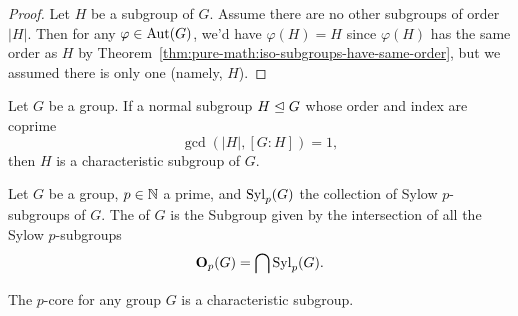 \begin{proof}
Let $H$ be a subgroup of $G$. Assume there are no other subgroups of
order $|H|$. Then for any $\varphi\in\operatorname{Aut}(G)$, we'd have $\varphi(H)=H$
since $\varphi(H)$ has the same order as $H$ by
Theorem~\ref{thm:pure-math:iso-subgroups-have-same-order}, but we
assumed there is only one (namely, $H$).
\end{proof}

\begin{theorem}
Let $G$ be a group. If a normal subgroup $H\trianglelefteq G$ whose
order and index are coprime
\begin{equation*}
\gcd(|H|, [G:H])=1,
\end{equation*}
then $H$ is a characteristic subgroup of $G$.
\end{theorem}

\begin{definition}
Let $G$ be a group, $p\in\mathbb{N}$ a prime, and $\mathop{\rm Syl}\nolimits_{p}(G)$ the
collection of Sylow $p$-subgroups of $G$. The  of $G$
is the Subgroup given by the intersection of all the Sylow $p$-subgroups
\begin{equation*}
\mathbf{O}_{p}(G) = \bigcap \mathop{\rm Syl}\nolimits_{p}(G).
\end{equation*}
\end{definition}

\begin{theorem}
The $p$-core for any group $G$ is a characteristic subgroup.
\end{theorem}
